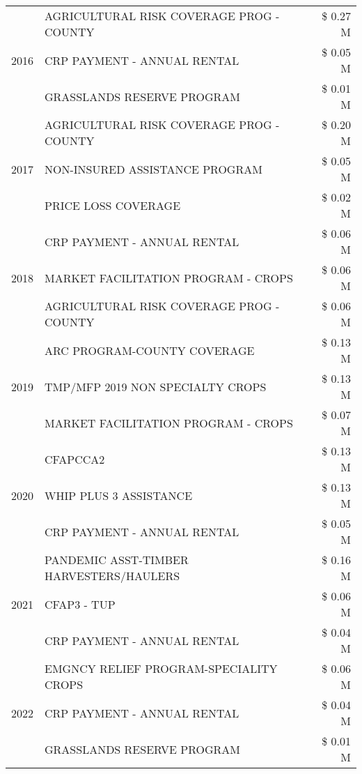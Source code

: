 \begin{tabular}{llr}
\cline{1-3}
\multirow[t]{3}{*}{2016} & AGRICULTURAL RISK COVERAGE PROG - COUNTY & \$ 0.27 M \\
 & CRP PAYMENT - ANNUAL RENTAL & \$ 0.05 M \\
 & GRASSLANDS RESERVE PROGRAM & \$ 0.01 M \\
\cline{1-3}
\multirow[t]{3}{*}{2017} & AGRICULTURAL RISK COVERAGE PROG - COUNTY & \$ 0.20 M \\
 & NON-INSURED ASSISTANCE PROGRAM & \$ 0.05 M \\
 & PRICE LOSS COVERAGE & \$ 0.02 M \\
\cline{1-3}
\multirow[t]{3}{*}{2018} & CRP PAYMENT - ANNUAL RENTAL & \$ 0.06 M \\
 & MARKET FACILITATION PROGRAM - CROPS & \$ 0.06 M \\
 & AGRICULTURAL RISK COVERAGE PROG - COUNTY & \$ 0.06 M \\
\cline{1-3}
\multirow[t]{3}{*}{2019} & ARC PROGRAM-COUNTY COVERAGE & \$ 0.13 M \\
 & TMP/MFP 2019 NON SPECIALTY CROPS & \$ 0.13 M \\
 & MARKET FACILITATION PROGRAM - CROPS & \$ 0.07 M \\
\cline{1-3}
\multirow[t]{3}{*}{2020} & CFAPCCA2 & \$ 0.13 M \\
 & WHIP PLUS 3 ASSISTANCE & \$ 0.13 M \\
 & CRP PAYMENT - ANNUAL RENTAL & \$ 0.05 M \\
\cline{1-3}
\multirow[t]{3}{*}{2021} & PANDEMIC ASST-TIMBER HARVESTERS/HAULERS & \$ 0.16 M \\
 & CFAP3 - TUP & \$ 0.06 M \\
 & CRP PAYMENT - ANNUAL RENTAL & \$ 0.04 M \\
\cline{1-3}
\multirow[t]{3}{*}{2022} & EMGNCY RELIEF PROGRAM-SPECIALITY CROPS & \$ 0.06 M \\
 & CRP PAYMENT - ANNUAL RENTAL & \$ 0.04 M \\
 & GRASSLANDS RESERVE PROGRAM & \$ 0.01 M \\
\cline{1-3}
\bottomrule
\end{tabular}
